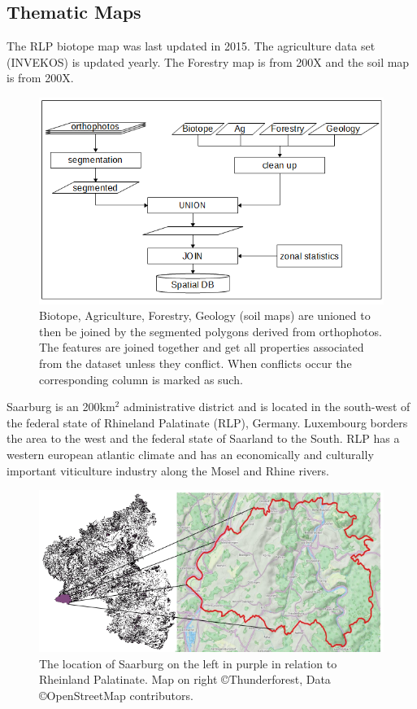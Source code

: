 \documentclass[authoryear, review,12pt,number]{elsarticle}
\begin{document}
\subsection{Thematic Maps} The RLP biotope map was last updated in 2015. The
agriculture data set (INVEKOS) is updated yearly. The Forestry map is from
200X and the soil map is from 200X.

\begin{figure} \includegraphics[width=1\textwidth]{diagrams/pre_processing.png}
    \caption{Biotope, Agriculture, Forestry, Geology (soil maps) are unioned to
    then be joined by the segmented polygons derived from orthophotos. The
    features are joined together and get all properties associated from the
    dataset unless they conflict. When conflicts occur the corresponding column
    is marked as such.}
\label{fig_pre-processing}
\end{figure}
Saarburg is an 200km$^{2}$ administrative district and is located in the
south-west of the federal state of Rhineland Palatinate (RLP), Germany.
Luxembourg borders the area to the west and the federal state of Saarland to
the South. RLP has a western european atlantic climate and has an economically
and culturally important viticulture industry along the Mosel and Rhine rivers.
\begin{figure}
\label{fig_study_area}
    \includegraphics[width=\textwidth]{diagrams/study_area_closeup.png}
    \caption{The location of Saarburg on the left in purple in relation to
    Rheinland Palatinate. Map on right \copyright Thunderforest, Data
\copyright OpenStreetMap contributors.}
\end{figure}
\end{document}

